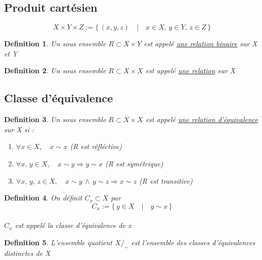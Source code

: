 \documentclass{article}
\newtheorem{definition}{Definition}[section]
\begin{document}
\subsection{Produit cartésien}
\[ X \times Y \times Z := \{\,(x,y,z)\quad |\quad x \in X,\,y \in Y,\, z \in Z\, \} \]
\begin{definition}
    Un sous ensemble \(R \subset X \times Y\) est appelé \underline{une relation binaire} sur X et Y
\end{definition}
\begin{definition}
    Un sous ensemble \(R \subset X \times X\) est appelé \underline{une relation} sur X
\end{definition}

\subsection{Classe d'équivalence}
\begin{definition}
    Un sous ensemble \(R \subset X \times X\) est appelé \underline{une relation d'équivalence} sur X si :
    \begin{enumerate}
        \item \( \forall x \in X,\quad x \sim x \) (R est réfléctive)
        \item \( \forall x,\,y \in X,\quad  x \sim y \Rightarrow y \sim x \) (R est symétrique)
        \item \( \forall x,\,y,\, z \in X,\quad x \sim y\, \wedge\, y \sim z \Rightarrow x \sim z \) (R est transitive)
    \end{enumerate}
\end{definition}
\begin{definition}
    On définit \(C_x \subset X \) par \\ \[ C_x := \{\, y \in X\quad |\quad y \sim x\, \} \] \\
    \(C_x\) est appelé la classe d'équivalence de x
\end{definition}
\begin{definition}
    L'ensemble quotient \(X/_\sim \) est l'ensemble des classes d'équivalences distinctes de X
\end{definition}
\end{document}
